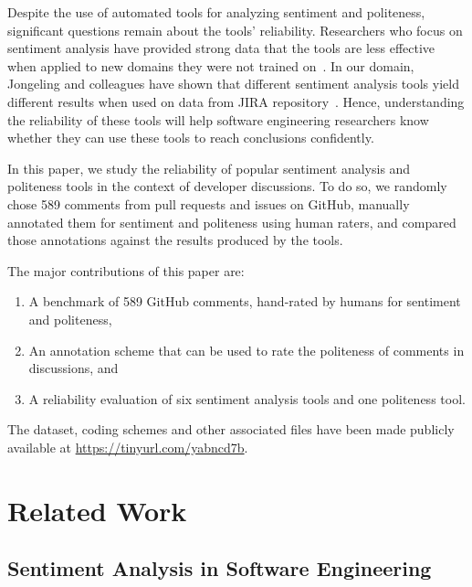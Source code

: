 Despite the use of automated tools for analyzing sentiment and 
politeness, significant questions remain about the tools' reliability.
Researchers who focus on sentiment analysis have provided strong data
that the tools are less effective when applied to new domains they 
were not trained on~\cite{novielli2015challenges,gamon2005pulse}. 
In our domain, Jongeling and colleagues have 
shown that different sentiment analysis tools yield different 
results when used on data from JIRA repository~\cite{jongeling2017negative}. 
Hence, understanding the reliability of these tools will help 
software engineering researchers know whether they can use these
tools to reach conclusions confidently.

In this paper, we study the reliability of popular sentiment analysis 
and politeness tools in the context of developer discussions.
To do so, we randomly chose 589 comments from pull requests and issues on GitHub,
manually annotated them for sentiment and politeness using human raters,
and compared those annotations against the results produced by the tools. 

The major contributions of this paper are:
\begin{enumerate}
    \item A benchmark of 589 GitHub comments, 
    hand-rated by humans for sentiment and politeness, 
    \item An annotation scheme that can be used to rate 
    the politeness of comments in discussions, and
    \item A reliability evaluation of six sentiment analysis 
    tools and one politeness tool.
\end{enumerate}

The dataset, coding schemes and other associated files have been made publicly available at \href{https://tinyurl.com/yabncd7b}{https://tinyurl.com/yabncd7b}.


\section{Related Work}\label{relwork}
\subsection{Sentiment Analysis in Software Engineering}\label{rwsent}

